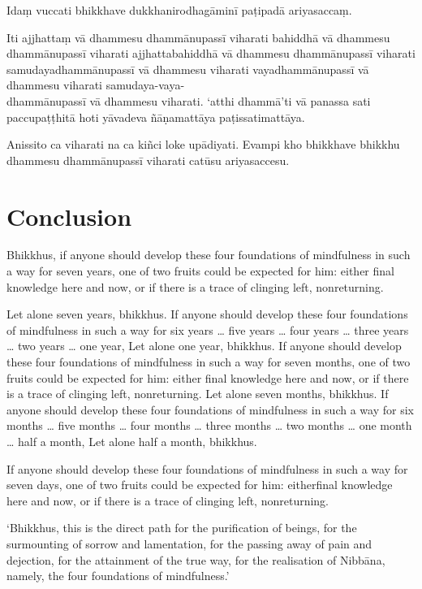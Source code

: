 Idaṃ vuccati bhikkhave dukkhanirodhagāminī paṭipadā ariyasaccaṃ.

Iti ajjhattaṃ vā dhammesu dhammānupassī viharati bahiddhā vā dhammesu
dhammānupassī viharati ajjhattabahiddhā vā dhammesu dhammānupassī viharati
samudayadhammānupassī vā dhammesu viharati vayadhammānupassī vā dhammesu
viharati samudaya-vaya-\\
dhammānupassī vā dhammesu viharati. `atthi dhammā'ti vā
panassa sati paccupaṭṭhitā hoti yāvadeva ñāṇamattāya paṭissatimattāya.

Anissito ca viharati na ca kiñci loke upādiyati. Evampi kho bhikkhave bhikkhu
dhammesu dhammānupassī viharati catūsu ariyasaccesu.



\englishPage
\chapter{Conclusion}

Bhikkhus, if anyone should develop these four foundations of mindfulness in
such a way for seven years, one of two fruits could be expected for him: either
final knowledge here and now, or if there is a trace of clinging left,
nonreturning.

Let alone seven years, bhikkhus. If anyone should develop these four
foundations of mindfulness in such a way for six years \ldots{} five years
\ldots{} four years \ldots{} three years \ldots{} two years \ldots{} one year,
Let alone one year, bhikkhus. If anyone should develop these four foundations
of mindfulness in such a way for seven months, one of two fruits could be
expected for him: either final knowledge here and now, or if there is a trace of
clinging left, nonreturning. Let alone seven months, bhikkhus. If anyone should
develop these four foundations of mindfulness in such a way for six months
\ldots{} five months \ldots{} four months \ldots{} three months \ldots{} two
months \ldots{} one month \ldots{} half a month, Let alone half a month,
bhikkhus.

If anyone should develop these four foundations of mindfulness in such a way
for seven days, one of two fruits could be expected for him: eitherfinal
knowledge here and now, or if there is a trace of clinging left, nonreturning.

`Bhikkhus, this is the direct path for the purification of beings, for the
surmounting of sorrow and lamentation, for the passing away of pain and
dejection, for the attainment of the true way, for the realisation of Nibbāna,
namely, the four foundations of mindfulness.'

